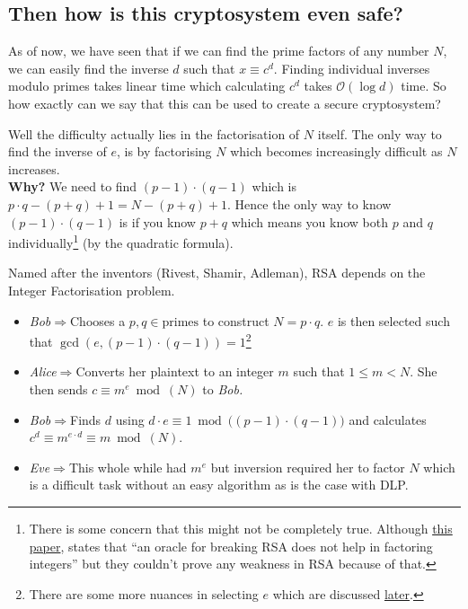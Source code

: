 		\subsection{Then how is this cryptosystem even safe?}
			As of now, we have seen that if we can find the prime factors of any number \(N\), we can easily find the inverse \(d\) such that \(x \equiv c^d\). Finding individual inverses modulo primes takes linear time which calculating \(c^d\) takes \(\mathcal{O}(\log d)\) time. So how exactly can we say that this can be used to create a secure cryptosystem?\par
			Well the difficulty actually lies in the factorisation of \(N\) itself. The only way to find the inverse of \(e\), is by factorising \(N\) which becomes increasingly difficult as \(N\) increases. \\
			\textbf{Why?} We need to find \((p-1)\cdot (q-1)\) which is \(p \cdot q - (p + q) + 1= N - (p+q) +1\). Hence the only way to know \((p-1) \cdot (q-1)\) is if you know $p+q$ which means you know both $p$ and $q$ individually\footnote{There is some concern that this might not be completely true. Although \href{https://link.springer.com/content/pdf/10.1007/BFb0054117.pdf}{this paper}, states that ``an oracle for breaking RSA does not help in factoring integers'' but they couldn't prove any weakness in RSA because of that.} (by the quadratic formula).

		Named after the inventors (Rivest, Shamir, Adleman), RSA depends on the Integer Factorisation problem.
		\begin{itemize}
			\item \emph{Bob}\(\Rightarrow\)Chooses a $p,q\in \text{primes}$ to construct \(N= p \cdot q\). \(e\) is then selected such that \(\gcd(e, (p-1)\cdot (q-1))=1\)\footnote{There are some more nuances in selecting \(e\) which are discussed \hyperref[subsec:nuances]{later}.}
			\item \emph{Alice}\(\Rightarrow\)Converts her plaintext to an integer \(m\) such that \(1\leq m<N\). She then sends \(c \equiv m^e \bmod(N)\) to \emph{Bob.}
			\item \emph{Bob}\(\Rightarrow\)Finds \(d\) using \(d\cdot e \equiv 1 \bmod\big((p-1)\cdot (q-1)\big)\) and calculates \(c^d \equiv m^{e\cdot d}\equiv m \bmod(N)\).
			\item \emph{Eve}$\Rightarrow$This whole while had $m^e$ but inversion required her to factor \(N\) which is a difficult task without an easy algorithm as is the case with DLP.
		\end{itemize}

